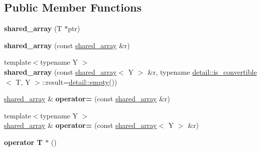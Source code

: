 \subsection*{Public Member Functions}
\begin{DoxyCompactItemize}
\item 
\hypertarget{classboost_1_1shared__array_a178d3ea55a727ec1b0b19b9d307629ae}{{\bfseries shared\+\_\+array} (T $\ast$ptr)}\label{classboost_1_1shared__array_a178d3ea55a727ec1b0b19b9d307629ae}

\item 
\hypertarget{classboost_1_1shared__array_a24c3b1529931d2e2a4d625d7b6f8378b}{{\bfseries shared\+\_\+array} (const \hyperlink{classboost_1_1shared__array}{shared\+\_\+array} \&r)}\label{classboost_1_1shared__array_a24c3b1529931d2e2a4d625d7b6f8378b}

\item 
\hypertarget{classboost_1_1shared__array_af543be2a5d5fbb42d8bcde22ed970236}{{\footnotesize template$<$typename Y $>$ }\\{\bfseries shared\+\_\+array} (const \hyperlink{classboost_1_1shared__array}{shared\+\_\+array}$<$ Y $>$ \&r, typename \hyperlink{structboost_1_1detail_1_1is__convertible}{detail\+::is\+\_\+convertible}$<$ T, Y $>$\+::result=\hyperlink{structboost_1_1detail_1_1empty}{detail\+::empty}())}\label{classboost_1_1shared__array_af543be2a5d5fbb42d8bcde22ed970236}

\item 
\hypertarget{classboost_1_1shared__array_a3ccdf02250908903f85c1267ceba45e4}{\hyperlink{classboost_1_1shared__array}{shared\+\_\+array} \& {\bfseries operator=} (const \hyperlink{classboost_1_1shared__array}{shared\+\_\+array} \&r)}\label{classboost_1_1shared__array_a3ccdf02250908903f85c1267ceba45e4}

\item 
\hypertarget{classboost_1_1shared__array_a3196e147a84d1393b8f02c7a00368602}{{\footnotesize template$<$typename Y $>$ }\\\hyperlink{classboost_1_1shared__array}{shared\+\_\+array} \& {\bfseries operator=} (const \hyperlink{classboost_1_1shared__array}{shared\+\_\+array}$<$ Y $>$ \&r)}\label{classboost_1_1shared__array_a3196e147a84d1393b8f02c7a00368602}

\item 
\hypertarget{classboost_1_1shared__array_a6c70a7e38526ed9590b25895dd369ab8}{{\bfseries operator T $\ast$} ()}\label{classboost_1_1shared__array_a6c70a7e38526ed9590b25895dd369ab8}


\end{DoxyCompactItemize}
